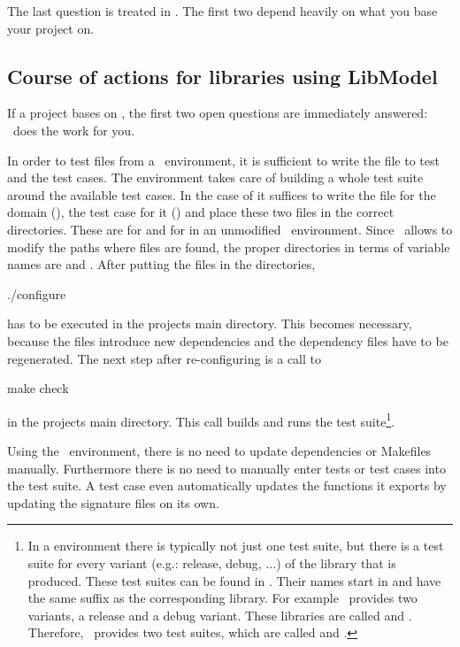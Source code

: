 The last question is treated in . The first two depend heavily on what you base your project on.

\subsection{Course of actions for libraries using LibModel}

If a project bases on \LibModel, the first two open questions are immediately answered: \LibModel~does the work for you.

In order to test files from a \LibModel~environment, it is sufficient to write the file to test and the test cases. The environment takes care of building a whole test suite around the available test cases. In the case of  it suffices to write the file for the domain (), the test case for it () and place these two files in the correct directories. These are  for  and  for  in an unmodified \LibModel~environment. Since \LibModel~allows to modify the paths where files are found, the proper directories in terms of variable names are  and . After putting the files in the directories, 
\begin{console}
./configure
\end{console}
has to be executed in the projects main directory. This becomes necessary, because the files introduce new dependencies and the dependency files have to be regenerated. The next step after re-configuring is a call to
\begin{console}
make check
\end{console}
in the projects main directory. This call builds and runs the test suite\footnote{In a \LibModel environment there is typically not just one test suite, but there is a test suite for every variant (e.g.: release, debug, $\ldots$) of the library that is produced. These test suites can be found in . Their names start in  and have the same suffix as the corresponding library. For example \projectname~provides two variants, a release and a debug variant. These libraries are called  and . Therefore, \projectname~provides two test suites, which are called  and .}.

Using the \LibModel~environment, there is no need to update dependencies or Makefiles manually. Furthermore there is no need to manually enter tests or test cases into the test suite. A test case even automatically updates the functions it exports by updating the signature files on its own.

